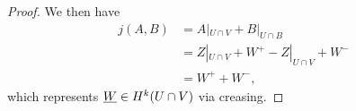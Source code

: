 \begin{proof}
We then have
\begin{align*}
j(A,B)& = A|_{U \cap V}+B|_{U \cap B}\\
& = Z|_{U \cap V}+ W^+ - Z|_{U \cap V} +W^-\\
& = W^++W^-,
\end{align*}
which represents $\underline{W} \in H^k(U \cap V)$ via creasing.
\end{proof}

